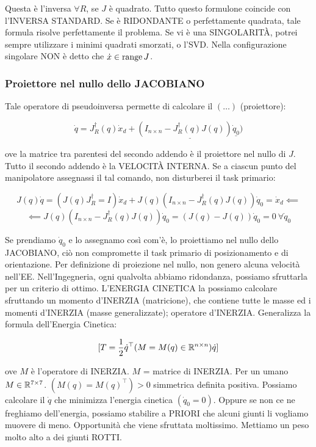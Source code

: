Questa è l'inversa $\forall R$, se $J$ è quadrato. Tutto questo formulone coincide con l'INVERSA STANDARD. Se è RIDONDANTE o perfettamente quadrata, tale formula risolve perfettamente il problema. Se vi è una SINGOLARIT\`A, potrei sempre utilizzare i minimi quadrati smorzati, o l'SVD. Nella configurazione singolare NON è detto che $\dot{x}\in\operatorname{range}{J}$.

\subsubsection{Proiettore nel nullo dello JACOBIANO}

Tale operatore di pseudoinversa permette di calcolare il $(\dots)$ (proiettore):

\[
	\dot{q} = J^\dag_R(q)\dot{x}_d + \underline{(I_{n\times n} - J^\dag_R(q)J(q))\underline{\dot{q}_0})}
\]

ove la matrice tra parentesi del secondo addendo è il proiettore nel nullo di $J$. Tutto il secondo addendo è la VELOCIT\`A INTERNA. Se a ciascun punto del manipolatore assegnassi il tal comando, non disturberei il task primario:

\[
	J(q)\dot{q} = (J(q)J^\dag_R=I)\dot{x}_d + J(q)(I_{n\times n} - J^\dag_R(q)J(q))\dot{q}_0 = \dot{x}_d \impliedby
\]
\[
	\impliedby J(q)(I_{n\times n} - J^\dag_R(q)J(q))\dot{q}_0 = (J(q)-J(q))\dot{q}_0 = 0\ \forall \dot{q}_0
\]

Se prendiamo $\dot{q}_0$ e lo assegnamo così com'è, lo proiettiamo nel nullo dello JACOBIANO, ciò non compromette il task primario di posizionamento e di orientazione. Per definizione di proiezione nel nullo, non genero alcuna velocità nell'EE. Nell'Ingegneria, ogni qualvolta abbiamo ridondanza, possiamo sfruttarla per un criterio di ottimo. L'ENERGIA CINETICA la possiamo calcolare sfruttando un momento d'INERZIA (matricione), che contiene tutte le masse ed i momenti d'INERZIA (masse generalizzate); operatore d'INERZIA. Generalizza la formula dell'Energia Cinetica:

\[
	[T=\frac{1}{2}\dot{q}^\top (M=M(q)\in\mathbb{R}^{n\times n})\dot{q}]
\]

ove $M$ è l'operatore di INERZIA. $M$ = matrice di INERZIA. Per un umano $M\in\mathbb{R}^{7\times 7}$. $(M(q)=M(q)^\top)>0$ simmetrica definita positiva. Possiamo calcolare il $\dot{q}$ che minimizza l'energia cinetica $(\dot{q}_0=0)$. Oppure se non ce ne freghiamo dell'energia, possiamo stabilire a PRIORI che alcuni giunti li vogliamo muovere di meno. Opportunità che viene sfruttata moltissimo. Mettiamo un peso molto alto a dei giunti ROTTI.

